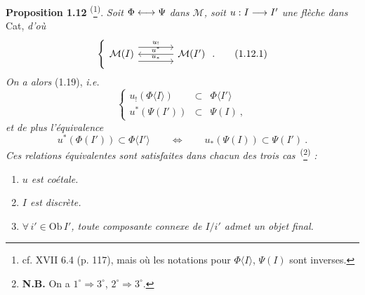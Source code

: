 \textbf{Proposition 1.12} \textsuperscript{(}\footnote[5]{cf. XVII 6.4 (p. 117), mais où les notations pour $\Phi\langle I\rangle$, $\Psi(I)$ sont inverses.}\textsuperscript{)}. \textit{Soit $\Phi \longleftrightarrow \Psi$ dans $\mathcal{M}$, soit $u : I \longrightarrow I'$ une flèche dans} Cat, \textit{d'où}
\[
\left\{
\begin{tikzcd}[column sep=large]
\mathcal{M}(I) \arrow[r, shift left=3, "u_{!}"] \arrow[r, shift right=3, "u_{*}"] & \mathcal{M}(I') \arrow[l, "u^{*}"']
\end{tikzcd}
\right.
.
\tag*{(1.12.1)}
\]
\textit{On a alors} (1.19), \textit{i.e.}
\[
\left\{
\begin{array}{rcl}
u_{!}(\Phi\langle I\rangle) & \subset & \Phi\langle I'\rangle \\
u^{*}(\Psi(I')) & \subset & \Psi(I)\ ,
\end{array}
\right.
\tag*{(1.13.1)}
\]
\textit{et de plus l'équivalence}
\[
u^{*}(\Phi(I')) \subset \Phi\langle I'\rangle \qquad \Longleftrightarrow \qquad u_{*}(\Psi(I)) \subset \Psi(I')\ . \tag*{(1.13.2)}
\]
\textit{Ces relations équivalentes sont satisfaites dans chacun des trois cas}~\textsuperscript{(}\footnote[6]{\textbf{N.B.} On a $1^{\circ} \Longrightarrow 3^{\circ}$, $2^{\circ} \Longrightarrow 3^{\circ}$.}\textsuperscript{)} \textit{:}
\begin{enumerate}[label={}]
\item[1°)] \textit{$u$ est coétale.}
\item[2°)] \textit{$I$ est discrète.}
\item[3°)] $\forall\, i' \in \mathrm{Ob}\, I'$\textit{, toute composante connexe de $I/i'$ admet un objet final.}
\end{enumerate}

